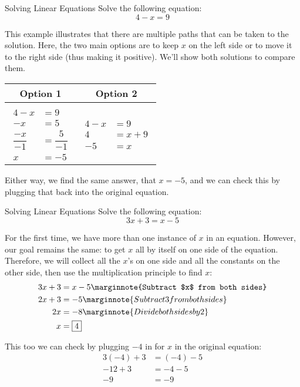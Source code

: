 \begin{example}{Solving Linear Equations}
Solve the following equation:
\[4-x=9\]

\sol
This example illustrates that there are multiple paths that can be taken to the solution.  Here, the two main options are to keep $x$ on the left side or to move it to the right side (thus making it positive).  We'll show both solutions to compare them.
\begin{center}
\begin{tabular}{c | c}
Option 1 & Option 2\\
\hline
\\
{$\begin{aligned}
4-x &= 9\\
-x &= 5\\
\dfrac{-x}{-1} &= \dfrac{5}{-1}\\
x &= -5
\end{aligned}$} & 
{$\begin{aligned}
4-x &= 9\\
4 &= x+9\\
-5 &= x
\end{aligned}$}
\end{tabular}
\end{center}

Either way, we find the same answer, that $\boxed{x=-5}$, and we can check this by plugging that back into the original equation.
\end{example}
\pagebreak

\begin{example}{Solving Linear Equations}
Solve the following equation:
\[3x+3 = x-5\]

\sol
For the first time, we have more than one instance of $x$ in an equation.  However, our goal remains the same: to get $x$ all by itself on one side of the equation.  Therefore, we will collect all the $x$'s on one side and all the constants on the other side, then use the multiplication principle to find $x$:
\begin{align*}
3x+3 &= x-5\marginnote{Subtract $x$ from both sides}\\
2x + 3 &= -5\marginnote{Subtract 3 from both sides}\\
2x &= -8\marginnote{Divide both sides by 2}\\
x &= \boxed{4}
\end{align*}

This too we can check by plugging $-4$ in for $x$ in the original equation:
\begin{align*}
3(-4) + 3 &= (-4)-5\\
-12 + 3 &= -4-5\\
-9 &= -9
\end{align*}
\end{example}

